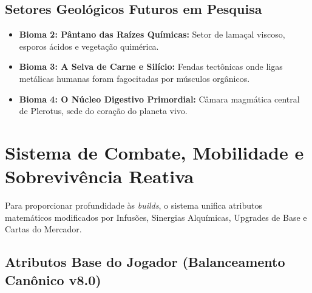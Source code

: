 \documentclass[a4paper,12pt]{report}
\begin{document}
\section{Setores Geológicos Futuros em Pesquisa}
\begin{itemize}
    \item \textbf{Bioma 2: Pântano das Raízes Químicas:} Setor de lamaçal viscoso, esporos ácidos e vegetação quimérica.
    \item \textbf{Bioma 3: A Selva de Carne e Silício:} Fendas tectônicas onde ligas metálicas humanas foram fagocitadas por músculos orgânicos.
    \item \textbf{Bioma 4: O Núcleo Digestivo Primordial:} Câmara magmática central de Plerotus, sede do coração do planeta vivo.
\end{itemize}

\chapter{Sistema de Combate, Mobilidade e Sobrevivência Reativa}

Para proporcionar profundidade às \textit{builds}, o sistema unifica atributos matemáticos modificados por Infusões, Sinergias Alquímicas, Upgrades de Base e Cartas do Mercador.

\section{Atributos Base do Jogador (Balanceamento Canônico v8.0)}
\end{document}
